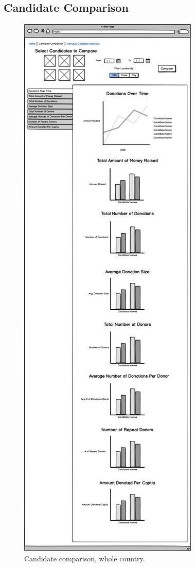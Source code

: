 \documentclass[12pt]{article}
\begin{document}
    \subsection{Candidate Comparison}
    \begin{figure}[H]
        \begin{center}
        \includegraphics[scale=.20]{candidatecompbyus}
        \caption{Candidate comparison, whole country.}
        \label{fig:2}
        \end{center}
    \end{figure}
\end{document}
